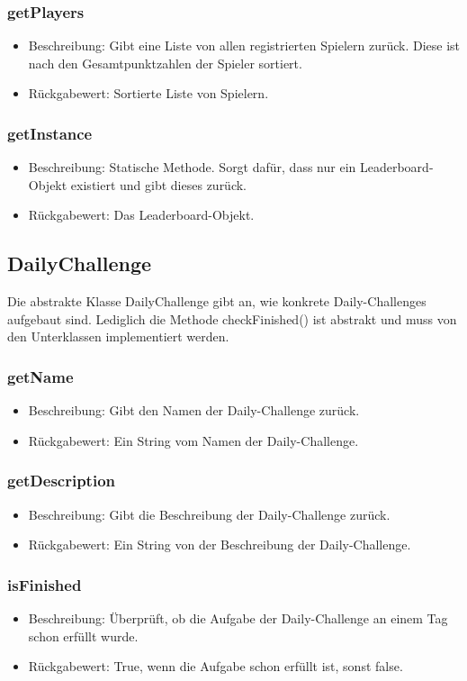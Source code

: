 \documentclass[a4paper]{scrreprt}
\begin{document}
	\subsubsection{getPlayers}
	\begin{itemize}
		\item Beschreibung: Gibt eine Liste von allen registrierten Spielern zurück. Diese ist nach den Gesamtpunktzahlen der Spieler sortiert.
		\item Rückgabewert: Sortierte Liste von Spielern.
	\end{itemize}
	\subsubsection{getInstance}
	\begin{itemize}
		\item Beschreibung: Statische Methode. Sorgt dafür, dass nur ein Leaderboard-Objekt existiert und gibt dieses zurück.
		\item Rückgabewert: Das Leaderboard-Objekt.
	\end{itemize}


	\subsection{DailyChallenge}
	Die abstrakte Klasse DailyChallenge gibt an, wie konkrete Daily-Challenges aufgebaut sind. Lediglich die Methode checkFinished() ist abstrakt und muss von den Unterklassen implementiert werden.
	\subsubsection{getName}
	\begin{itemize}
		\item Beschreibung: Gibt den Namen der Daily-Challenge zurück.
		\item Rückgabewert: Ein String vom Namen der Daily-Challenge.
	\end{itemize}
	\subsubsection{getDescription}
	\begin{itemize}
		\item Beschreibung: Gibt die Beschreibung der Daily-Challenge zurück.
		\item Rückgabewert: Ein String von der Beschreibung der Daily-Challenge.
	\end{itemize}
	\subsubsection{isFinished}
	\begin{itemize}
		\item Beschreibung: Überprüft, ob die Aufgabe der Daily-Challenge an einem Tag schon erfüllt wurde.
		\item Rückgabewert: True, wenn die Aufgabe schon erfüllt ist, sonst false.
	\end{itemize}
\end{document}

